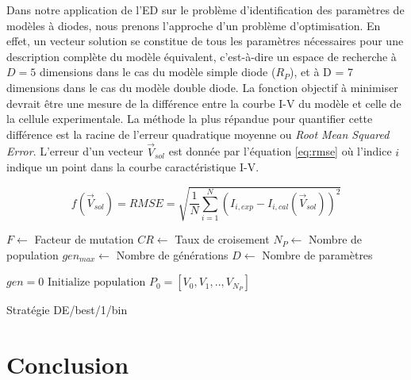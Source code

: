 Dans notre application de l'ED sur le problème d'identification des paramètres de modèles à diodes, nous prenons l'approche d'un problème d'optimisation. En effet, un vecteur solution se constitue de tous les paramètres nécessaires pour une description complète du modèle équivalent, c'est-à-dire un espace de recherche à $D = 5$ dimensions dans le cas du modèle simple diode ($R_P$), et à D = 7 dimensions dans le cas du modèle double diode. La fonction objectif à minimiser devrait être une mesure de la différence entre la courbe I-V du modèle et celle de la cellule experimentale. La méthode la plus répandue pour quantifier cette différence est la racine de l'erreur quadratique moyenne ou \textit{Root Mean Squared Error}. L'erreur d'un vecteur $\vec{V}_{sol}$ est donnée par l'équation \ref{eq:rmse} où l'indice $i$ indique un point dans la courbe caractéristique I-V.

\begin{equation}
  \label{eq:rmse}
  f(\vec{V}_{sol}) = RMSE = \sqrt{\frac{1}{N} \sum_{i = 1}^{N} (I_{i,exp} - I_{i, cal}(\vec{V}_{sol}))^2 }
\end{equation}

\begin{algorithm}
  $F \gets$ Facteur de mutation\;
  $CR \gets$ Taux de croisement\;
  $N_P \gets$ Nombre de population\;
  $gen_{max} \gets$ Nombre de générations\;
  $D \gets $ Nombre de paramètres\;
  
  $gen = 0$\;
  $\text{Initialize population\ } P_0 = [V_0, V_1, .., V_{N_P}]$\;
  \caption{Stratégie DE/best/1/bin}
  \label{alg:debestbin}
\end{algorithm}



\section{Conclusion}
